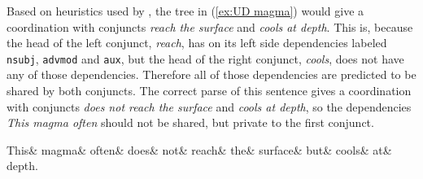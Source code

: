 Based on heuristics used by \cite{pbg2023}, the tree in (\ref{ex:UD magma}) would give a coordination with conjuncts \textsl{reach the surface} and \textsl{cools at depth}. This is, because the head of the left conjunct, \textsl{reach}, has on its left side dependencies labeled \texttt{nsubj}, \texttt{advmod} and \texttt{aux}, but the head of the right conjunct, \textsl{cools}, does not have any of those dependencies. Therefore all of those dependencies are predicted to be shared by both conjuncts. The correct parse of this sentence gives a coordination with conjuncts \textsl{does not reach the surface} and \textsl{cools at depth}, so the dependencies \textsl{This magma often} should not be shared, but private to the first conjunct. 

\begin{adjustwidth}{-20pt}{20pt}
\begin{exe}
    \ex\label{ex:UD magma}
    \begin{dependency}[hide label, baseline=-\the\dimexpr\fontdimen22\textfont2\relax]
        \begin{deptext}
            This\& magma\& often\& does\& not\& reach\& the\& surface\& but\& cools\& at\& depth.\footnotemark\\
        \end{deptext}
\end{dependency}
\end{exe}
\end{adjustwidth}

